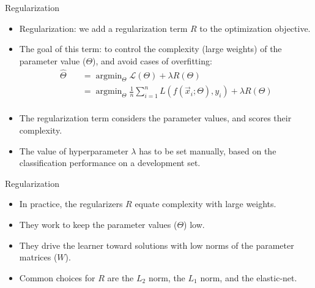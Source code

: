 \documentclass[handout]{beamer}
\begin{document}
\begin{frame}{Regularization}
\begin{scriptsize}
\begin{itemize}
  \item Regularization: we add a regularization term $R$ to the optimization objective.
  \item  The goal of this term: to control the complexity (large weights) of the parameter value ($\Theta$), and avoid cases of overfitting:
\begin{equation}
 \begin{split}
  \hat{\Theta} \quad & =  \operatorname{argmin}_{\Theta} \mathcal{L}(\Theta) + \lambda R(\Theta) \\
     \quad & =  \operatorname{argmin}_{\Theta} \frac{1}{n} \sum_{i=1}^n L(f(\vec{x}_i;\Theta), y_i) + \lambda R(\Theta) \\
 \end{split}
\end{equation}  
\item The regularization term considers the parameter values, and scores their complexity.  
\item The value of hyperparameter $\lambda$ has to be set manually, based on the classification performance on a development set.   
 
\end{itemize}
\end{scriptsize}

\end{frame}



\begin{frame}{Regularization}
\begin{scriptsize}
\begin{itemize}
  \item  In practice, the regularizers $R$ equate complexity with large weights.
  \item They work to keep the parameter values ($\Theta$) low.
  \item They drive the learner toward solutions with low norms of the parameter matrices ($W$).
  \item Common choices for $R$ are the $L_2$ norm, the $L_1$ norm, and the elastic-net.
\end{itemize}
\end{scriptsize}

\end{frame}
\end{document}
